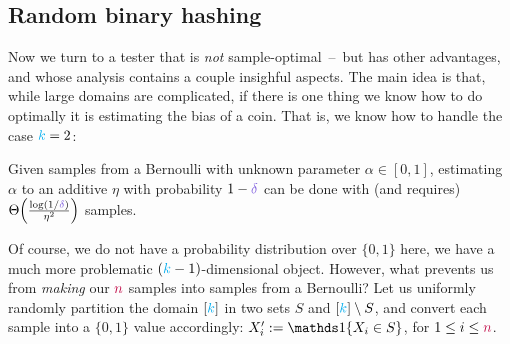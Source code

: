 \subsection{Random binary hashing} 
Now we turn to a tester that is \emph{not} sample-optimal~--~but has other advantages, and whose analysis contains a couple insighful aspects. The main idea is that, while large domains are complicated, if there is one thing we know how to do optimally it is estimating the bias of a coin. That is, we know how to handle the case ${\textcolor{cyan}{k}}=2$:
\begin{fact}
  \label{lemma:bias:coin}
  Given \iid samples from a Bernoulli with unknown parameter $\alpha\in[0,1]$, estimating $\alpha$ to an additive $\eta$ with probability $1-\errprob$ can be done with (and requires) $\bigTheta{\frac{\log(1/\errprob)}{\eta^2}}$ samples.
\end{fact} 
Of course, we do not have a probability distribution over $\{0,1\}$ here, we have a much more problematic $({\textcolor{cyan}{k}}-1)$-dimensional object. However, what prevents us from \emph{making} our ${\textcolor{purple}{n}}$ samples into \iid samples from a Bernoulli? Let us uniformly randomly partition the domain $[{\textcolor{cyan}{k}}]$ in two sets $S$ and $[{\textcolor{cyan}{k}}]\setminus S$, and convert each sample into a $\{0,1\}$ value accordingly: $X'_i \eqdef \indic{X_i\in S}$, for $1\leq i\leq {\textcolor{purple}{n}}$.

